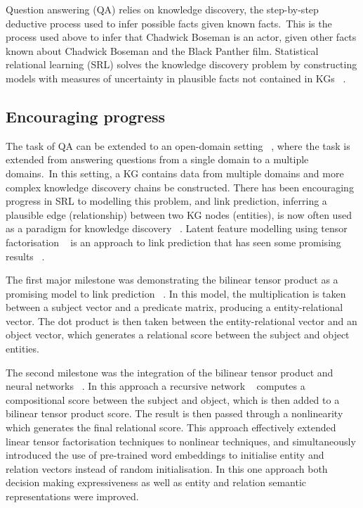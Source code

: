 \noindent Question answering (QA) relies on knowledge discovery, the step-by-step deductive process used to infer possible facts given known facts.\ This is the process used above to infer that Chadwick Boseman is an actor, given other facts known about Chadwick Boseman and the Black Panther film. Statistical relational learning (SRL) solves the knowledge discovery problem by constructing models with measures of uncertainty in plausible facts not contained in KGs \unskip~\citep{koller2007introduction}.\par

\subsection{Encouraging progress} 

The task of QA can be extended to an open-domain setting \unskip~\citep{chen2017reading}, where the task is extended from answering questions from a single domain to a multiple domains.\ In this setting, a KG contains data from multiple domains and more complex knowledge discovery chains be constructed. There has been encouraging progress in SRL to modelling this problem, and link prediction, inferring a plausible edge (relationship) between two KG nodes (entities), is now often used as a paradigm for knowledge discovery \unskip~\citep{kristiadi2019incorporating, ebisu2018toruse, nguyen2017novel}. Latent feature modelling using tensor factorisation \unskip~\citep{harshman1978models, kolda2009tensor} is an approach to link prediction that has seen some promising results \unskip~\citep{bordes2011learning, jenatton2012latent, nickel2016holographic}. \par 

\noindent The first major milestone was demonstrating the bilinear tensor product as a promising model to link prediction \unskip~\citep{nickel2011three}. In this model, the multiplication is taken between a subject vector and a predicate matrix, producing a entity-relational vector. The dot product is then taken between the entity-relational vector and an object vector, which generates a relational score between the subject and object entities. \par

\noindent The second milestone was the integration of the bilinear tensor product and neural networks \unskip~\citep{socher2013reasoning}. In this approach a recursive network \unskip~\citep{pollack1990recursive} computes a compositional score between the subject and object, which is then added to a bilinear tensor product score. The result is then passed through a nonlinearity which generates the final relational score. This approach effectively extended linear tensor factorisation techniques to nonlinear techniques, and simultaneously introduced the use of pre-trained word embeddings to initialise entity and relation vectors instead of random initialisation. In this one approach both decision making expressiveness as well as entity and relation semantic representations were improved. \par

